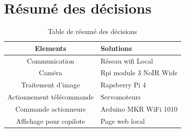 \section{Résumé des décisions}
\begin{table}[H]
    \begin{center}
        \caption{Table de résumé des décisions}
        \begin{tabular}{|c|l|}
            Elements                  & Solutions                        \\ \hline
            Communication             & Réseau \Gls{wifi} Local          \\
            Caméra                    & Rpi module 3 NoIR Wide           \\
            Traitement d'image        & Rapsberry Pi 4                   \\
            Actionnement télécommande & Servomoteurs                     \\
            Commande actionneurs      & Arduino MKR WiFi 1010 \cite{MKR} \\
            Affichage pour copilote   & Page web local                   \\
        \end{tabular}
    \end{center}
\end{table}\\
